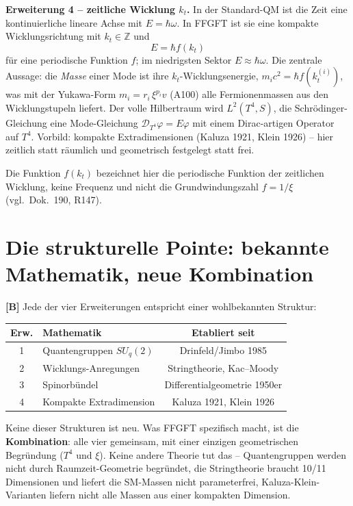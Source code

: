 \textbf{Erweiterung 4 -- zeitliche Wicklung $k_t$.} In der Standard-QM ist die
Zeit eine kontinuierliche lineare Achse mit $E=\hbar\omega$. In FFGFT ist sie eine
kompakte Wicklungsrichtung mit $k_t\in\mathbb{Z}$ und
\[
  \boxed{\;E = \hbar f(k_t)\;}
\]
für eine periodische Funktion $f$; im niedrigsten Sektor $E\approx\hbar\omega$.
Die zentrale Aussage: die \emph{Masse} einer Mode ist ihre
$k_t$-Wicklungsenergie, $m_i c^2 = \hbar f(k_t^{(i)})$, was mit der Yukawa-Form
$m_i = r_i\,\xi^{p_i}v$ (A100) alle Fermionenmassen aus den
Wicklungstupeln liefert. Der volle Hilbertraum wird $L^2(T^4, S)$, die
Schrödinger-Gleichung eine Mode-Gleichung $\mathcal{D}_{T^4}\varphi = E\varphi$
mit einem Dirac-artigen Operator auf $T^4$. Vorbild: kompakte Extradimensionen
(Kaluza 1921, Klein 1926) -- hier zeitlich statt räumlich und geometrisch
festgelegt statt frei.

Die Funktion $f(k_t)$ bezeichnet hier die periodische Funktion der zeitlichen Wicklung, keine Frequenz und nicht die Grundwindungszahl $f = 1/\xi$ (vgl.\ Dok.~190, R147).

\section{Die strukturelle Pointe: bekannte Mathematik, neue Kombination}

\textbf{[B]} Jede der vier Erweiterungen entspricht einer wohlbekannten Struktur:

\begin{center}
\renewcommand{\arraystretch}{1.4}
{\small
\begin{tabular}{clc}
\toprule
\textbf{Erw.} & \textbf{Mathematik} & \textbf{Etabliert seit} \\
\midrule
1 & Quantengruppen $SU_q(2)$ & Drinfeld/Jimbo 1985 \\
2 & Wicklungs-Anregungen & Stringtheorie, Kac--Moody \\
3 & Spinorbündel & Differentialgeometrie 1950er \\
4 & Kompakte Extradimension & Kaluza 1921, Klein 1926 \\
\bottomrule
\end{tabular}
}
\renewcommand{\arraystretch}{1.0}
\end{center}

Keine dieser Strukturen ist neu. Was FFGFT spezifisch macht, ist die
\textbf{Kombination}: alle vier gemeinsam, mit einer einzigen geometrischen
Begründung ($T^4$ und $\xi$). Keine andere Theorie tut das -- Quantengruppen
werden nicht durch Raumzeit-Geometrie begründet, die Stringtheorie braucht 10/11
Dimensionen und liefert die SM-Massen nicht parameterfrei, Kaluza-Klein-Varianten
liefern nicht alle Massen aus einer kompakten Dimension.

